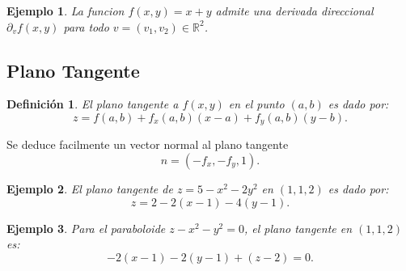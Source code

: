 \documentclass[11pt]{book}
\newcommand{\R}{\mathbb{R}}
\theoremstyle{definicion}
\theoremstyle{teorema}
\theoremstyle{ejemplo}
\newtheorem{definition}{Definición}
\newtheorem{example}{Ejemplo}
\begin{document}
\begin{example}
La funcion $f(x,y)=x+y$
admite una derivada direccional $\partial_v f(x,y)$ para todo $v=(v_1,v_2)\in\R^2$.    
\end{example}
 
\subsection{Plano Tangente}




\begin{definition}
El plano tangente a $f(x,y)$ en el punto $(a,b)$ es dado por:
\begin{equation}
    z = f(a,b) + f_x(a,b) (x-a) + f_y(a,b) (y-b).
\end{equation}    
\end{definition}
\noindent 
Se deduce facilmente un vector normal al plano tangente
\[
n = ( -f_x , -f_y , 1).
\]
%

\begin{example}
El plano tangente de $z=5-x^2-2y^2$ en $(1,1,2)$ es dado por:
\[
z=2-2(x-1)-4(y-1).
\]
\end{example}

\begin{example}
Para el paraboloide \( %
z - x^2 - y^2 = 0 \), el plano tangente en \( (1, 1, 2) \) es:
\[
-2(x-1) - 2(y-1) + (z-2) = 0.
\]
\end{example}

\end{document}
